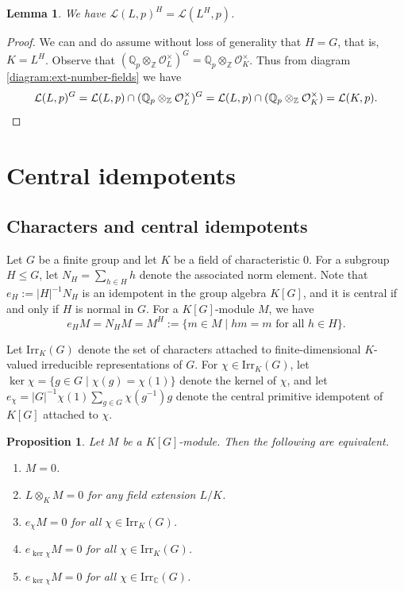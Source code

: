 \documentclass[12pt]{amsart}
\theoremstyle{plain}
\newtheorem{lemma}[theorem]{Lemma}
\newtheorem{prop}[theorem]{Proposition}
\theoremstyle{remark}
\theoremstyle{definition}
\newcommand{\Z}{\mathbb{Z}}
\newcommand{\Q}{\mathbb{Q}}
\newcommand{\C}{\mathbb{C}}
\newcommand{\Irr}{\mathrm{Irr}}
\numberwithin{equation}{section}
\begin{document}
\begin{lemma}\label{lem:invariants-of-Leopold-kernel}
We have $\mathcal{L}(L,p)^{H} = \mathcal{L}(L^{H},p)$.
\end{lemma}

\begin{proof}
We can and do assume without loss of generality that $H=G$, that is, $K=L^{H}$.
Observe that 
$(\Q_{p} \otimes_{\Z} \mathcal{O}_{L}^{\times})^{G} = \Q_{p} \otimes_{\Z} \mathcal{O}_{K}^{\times}$.
Thus from diagram \eqref{diagram:ext-number-fields} we have
\[
\mathcal{L}(L,p)^{G} 
= \mathcal{L}(L,p) \cap (\Q_{p} \otimes_{\Z} \mathcal{O}_{L}^{\times})^{G} 
= \mathcal{L}(L,p) \cap (\Q_{p} \otimes_{\Z} \mathcal{O}_{K}^{\times}) 
= \mathcal{L}(K,p).
\qedhere
\]
\end{proof}

\section{Central idempotents}\label{sec:central-idempotents}

\subsection{Characters and central idempotents}\label{subsec:chars-idems}
Let $G$ be a finite group and let $K$ be a field of characteristic $0$.
For a subgroup $H \leq G$, let $N_{H} = \sum_{h \in H} h$ denote the associated norm element.
Note that $e_{H} := |H|^{-1} N_{H}$ is an idempotent in the group algebra $K[G]$, and it is central 
if and only if $H$ is normal in $G$.
For a $K[G]$-module $M$, we have
\[
e_{H}M=N_{H}M=M^{H}:=\{ m \in M \mid hm=m \textrm{ for all } h \in H \}.
\] 

Let $\mathrm{Irr}_{K}(G)$ denote the set of characters attached to finite-dimensional $K$-valued irreducible representations of $G$. For $\chi \in \Irr_{K}(G)$, let $\ker\chi = \{ g \in G \mid \chi(g)=\chi(1) \}$ denote the kernel of $\chi$, and let 
$e_{\chi} = |G|^{-1}\chi(1)\sum_{g \in G}\chi(g^{-1})g$
denote the central primitive idempotent of $K[G]$ attached to $\chi$.


\begin{prop}\label{prop:equiv-vanishing}
Let $M$ be a $K[G]$-module. 
Then the following are equivalent.
\begin{enumerate}
\item $M=0$.
\item $L \otimes_{K} M = 0$ for any field extension $L/K$.
\item $e_{\chi}M=0$ for all $\chi \in \Irr_{K}(G)$.
\item $e_{\ker\chi}M=0$ for all $\chi \in \Irr_{K}(G)$.
\item $e_{\ker\chi}M=0$ for all $\chi \in \Irr_{\C}(G)$.
\end{enumerate}
\end{prop}
\end{document}
